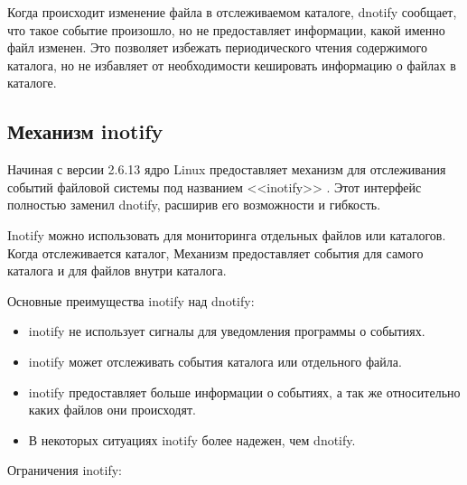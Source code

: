\documentclass[14pt, russian]{scrartcl}
\begin{document}
Когда происходит изменение файла в отслеживаемом каталоге, dnotify сообщает, что
такое событие произошло, но не предоставляет информации, какой именно файл
изменен. Это позволяет избежать периодического чтения содержимого каталога, но
не избавляет от необходимости кешировать информацию о файлах в каталоге.

\subsection{Механизм inotify}%
\label{subsec:inotify}

Начиная с версии 2.6.13 ядро Linux предоставляет механизм для отслеживания
событий файловой системы под названием <<inotify>> \cite{inotify}. Этот интерфейс полностью
заменил dnotify, расширив его возможности и гибкость.

Inotify можно использовать для мониторинга отдельных файлов или каталогов. Когда
отслеживается каталог, Механизм предоставляет события для самого каталога и для
файлов внутри каталога.

Основные преимущества inotify над dnotify:

\begin{itemize}
  \item inotify не использует сигналы для уведомления программы о событиях.
  \item inotify может отслеживать события каталога или отдельного файла.
  \item inotify предоставляет больше информации о событиях, а так же относительно каких
        файлов они происходят.
  \item В некоторых ситуациях inotify более надежен, чем dnotify.
\end{itemize}

Ограничения inotify:
\end{document}
